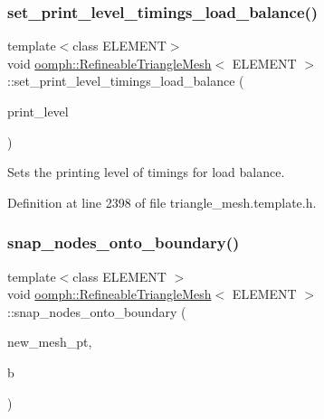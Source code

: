 \mbox{\label{classoomph_1_1RefineableTriangleMesh_a1bde786a756e1a076df48fe11b8640f9}} 
\subsubsection{\texorpdfstring{set\+\_\+print\+\_\+level\+\_\+timings\+\_\+load\+\_\+balance()}{set\_print\_level\_timings\_load\_balance()}}
{\footnotesize\ttfamily template$<$class E\+L\+E\+M\+E\+NT$>$ \\
void \hyperlink{classoomph_1_1RefineableTriangleMesh}{oomph\+::\+Refineable\+Triangle\+Mesh}$<$ E\+L\+E\+M\+E\+NT $>$\+::set\+\_\+print\+\_\+level\+\_\+timings\+\_\+load\+\_\+balance (\begin{DoxyParamCaption}\item[{const unsigned \&}]{print\+\_\+level }\end{DoxyParamCaption})\hspace{0.3cm}{\ttfamily [inline]}}



Sets the printing level of timings for load balance. 



Definition at line 2398 of file triangle\+\_\+mesh.\+template.\+h.

\mbox{\label{classoomph_1_1RefineableTriangleMesh_a3c302af1c17063eb32f56abe9f000360}} 
\subsubsection{\texorpdfstring{snap\+\_\+nodes\+\_\+onto\+\_\+boundary()}{snap\_nodes\_onto\_boundary()}}
{\footnotesize\ttfamily template$<$class E\+L\+E\+M\+E\+NT $>$ \\
void \hyperlink{classoomph_1_1RefineableTriangleMesh}{oomph\+::\+Refineable\+Triangle\+Mesh}$<$ E\+L\+E\+M\+E\+NT $>$\+::snap\+\_\+nodes\+\_\+onto\+\_\+boundary (\begin{DoxyParamCaption}\item[{\hyperlink{classoomph_1_1RefineableTriangleMesh}{Refineable\+Triangle\+Mesh}$<$ E\+L\+E\+M\+E\+NT $>$ $\ast$\&}]{new\+\_\+mesh\+\_\+pt,  }\item[{const unsigned \&}]{b }\end{DoxyParamCaption})\hspace{0.3cm}{\ttfamily [protected]}}



